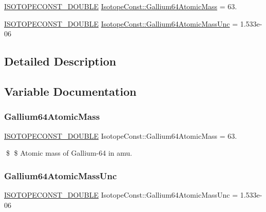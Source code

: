 \begin{DoxyCompactItemize}
\item 
\mbox{\hyperlink{group___isotope_const-_macros_ga8f45a7272ce02c0b4c65c44636ed719a}{I\+S\+O\+T\+O\+P\+E\+C\+O\+N\+S\+T\+\_\+\+D\+O\+U\+B\+LE}} \mbox{\hyperlink{group___isotope_const-_gallium-_ga64_ga32373ed29df0a6360871d133b79fdbaa}{Isotope\+Const\+::\+Gallium64\+Atomic\+Mass}} = 63.
\item 
\mbox{\hyperlink{group___isotope_const-_macros_ga8f45a7272ce02c0b4c65c44636ed719a}{I\+S\+O\+T\+O\+P\+E\+C\+O\+N\+S\+T\+\_\+\+D\+O\+U\+B\+LE}} \mbox{\hyperlink{group___isotope_const-_gallium-_ga64_ga862518de4dfc821ed18fc482acc37975}{Isotope\+Const\+::\+Gallium64\+Atomic\+Mass\+Unc}} = 1.\+533e-\/06
\end{DoxyCompactItemize}


\subsection{Detailed Description}


\subsection{Variable Documentation}
\mbox{\label{group___isotope_const-_gallium-_ga64_ga32373ed29df0a6360871d133b79fdbaa}} 
\subsubsection{\texorpdfstring{Gallium64\+Atomic\+Mass}{Gallium64AtomicMass}}
{\footnotesize\ttfamily \mbox{\hyperlink{group___isotope_const-_macros_ga8f45a7272ce02c0b4c65c44636ed719a}{I\+S\+O\+T\+O\+P\+E\+C\+O\+N\+S\+T\+\_\+\+D\+O\+U\+B\+LE}} Isotope\+Const\+::\+Gallium64\+Atomic\+Mass = 63.}

\$ \$ Atomic mass of Gallium-\/64 in amu. \mbox{\label{group___isotope_const-_gallium-_ga64_ga862518de4dfc821ed18fc482acc37975}} 
\subsubsection{\texorpdfstring{Gallium64\+Atomic\+Mass\+Unc}{Gallium64AtomicMassUnc}}
{\footnotesize\ttfamily \mbox{\hyperlink{group___isotope_const-_macros_ga8f45a7272ce02c0b4c65c44636ed719a}{I\+S\+O\+T\+O\+P\+E\+C\+O\+N\+S\+T\+\_\+\+D\+O\+U\+B\+LE}} Isotope\+Const\+::\+Gallium64\+Atomic\+Mass\+Unc = 1.\+533e-\/06}

